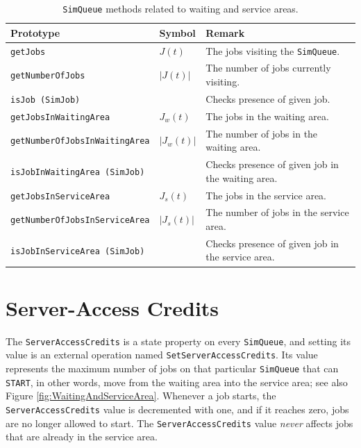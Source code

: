 \begin{table}[h]
\caption{\texttt{SimQueue} methods related to waiting and service areas.}
\label{simqueue-methods-areas}
\begin{center}
\begin{tabular}{|l|l|l|}
\hline
Prototype & Symbol & Remark \\ \hline
\lstinline|getJobs|                      & $J(t)$      & The jobs visiting the \lstinline|SimQueue|.       \\ \hline
\lstinline|getNumberOfJobs|              & $|J(t)|$    & The number of jobs currently visiting.            \\ \hline
\lstinline|isJob (SimJob)|               &             & Checks presence of given job.                     \\ \hline
\lstinline|getJobsInWaitingArea|         & $J_w(t)$    & The jobs in the waiting area.                     \\ \hline
\lstinline|getNumberOfJobsInWaitingArea| & $|J_w(t)|$  & The number of jobs in the waiting area.           \\ \hline
\lstinline|isJobInWaitingArea (SimJob)|  &             & Checks presence of given job in the waiting area. \\ \hline
\lstinline|getJobsInServiceArea|         & $J_s(t)$    & The jobs in the service area.                     \\ \hline
\lstinline|getNumberOfJobsInServiceArea| & $|J_s(t)|$  & The number of jobs in the service area.           \\ \hline
\lstinline|isJobInServiceArea (SimJob)|  &             & Checks presence of given job in the service area. \\ \hline
\end{tabular}
\end{center}
\end{table}

\section{Server-Access Credits}
\label{sec:guided:sac}

The \lstinline|ServerAccessCredits|
  is a state property on every \lstinline|SimQueue|,
  and setting its value is an
  external operation
  named \lstinline|SetServerAccessCredits|.
Its value represents the maximum number of
  jobs on that particular \lstinline|SimQueue|
  that can \lstinline|START|,
  in other words,
  move from the waiting area into
  the service area;
  see also Figure \ref{fig:WaitingAndServiceArea}.
Whenever a job starts,
  the \lstinline|ServerAccessCredits| value
  is decremented with one,
  and if it reaches zero,
  jobs are no longer allowed to start.
The \lstinline|ServerAccessCredits| value
  {\em never\/}
  affects jobs that are already in the
  service area.

